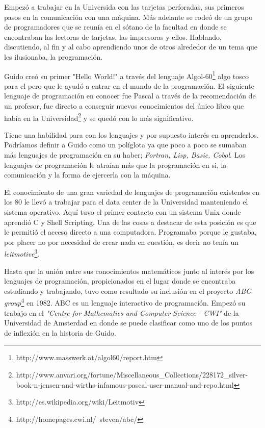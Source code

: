 \documentclass[11pt]{scrartcl}
\begin{document}
Empezó a trabajar en la Universida con las tarjetas perforadas, sus primeros pasos en la comunicación con una máquina. Más adelante se rodeó de un grupo de programadores que se reunía en el sótano de la facultad en donde se encontraban las lectoras de tarjetas, las impresoras y ellos. Hablando, discutiendo, al fin y al cabo aprendiendo unos de otros alrededor de un tema que les ilusionaba, la programación.

Guido creó su primer "Hello World!" a través del lenguaje Algol-60\footnote{http://www.masswerk.at/algol60/report.htm} algo tosco para el pero que le ayudó a entrar en el mundo de la programación. El siguiente lenguaje de programación en conocer fue Pascal a través de la recomendación de un profesor, fue directo a conseguir nuevos conocimientos del único libro que había en la Universidad\footnote{http://www.anvari.org/fortune/Miscellaneous\_Collections/228172\_silver-book-n-jensen-and-wirths-infamous-pascal-user-manual-and-repo.html} y se quedó con lo más significativo.

Tiene una habilidad para con los lenguajes y por supuesto interés en aprenderlos. Podríamos definir a Guido como un políglota ya que poco a poco se sumaban más lenguajes de programación en su haber; \emph{Fortran, Lisp, Basic, Cobol}. Los lenguajes de programación le atraían más que la programación en si, la comunicación y la forma de ejercerla con la máquina.

El conocimiento de una gran variedad de lenguajes de programación existentes en los 80 le llevó a trabajar para el data center de la Universidad manteniendo el sistema operativo. Aquí tuvo el primer contacto con un sistema Unix donde aprendió C y Shell Scripting. Una de las cosas a destacar de esta posición es que le permitió el acceso directo a una computadora. Programaba porque le gustaba, por placer no por necesidad de crear nada en cuestión, es decir no tenía un \emph{leitmotive}\footnote{http://es.wikipedia.org/wiki/Leitmotiv}.

Hasta que la unión entre sus conocimientos matemáticos junto al interés por los lenguajes de programación, propicionados en el lugar donde se encontraba estudiando y trabajando, tuvo como resultado su inclusión en el proyecto \emph{ABC group}\footnote{http://homepages.cwi.nl/~steven/abc/} en 1982. ABC es un lenguaje interactivo de programación. Empezó su trabajo en el \emph{"Centre for Mathematics and Computer Science - CWI"} de la Universidad de Amsterdad en donde se puede clasificar como uno de los puntos de inflexión en la historia de Guido.
\end{document}
